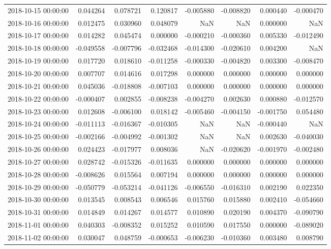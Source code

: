 \begin{tabular}{lrrrrrrr}
2018-10-15 00:00:00 & 0.044264 & 0.078721 & 0.120817 & -0.005880 & -0.008820 & 0.000440 & -0.000470 \\
2018-10-16 00:00:00 & 0.012475 & 0.030960 & 0.048079 & NaN & NaN & 0.000000 & NaN \\
2018-10-17 00:00:00 & 0.014282 & 0.045474 & 0.000000 & -0.000210 & -0.000360 & 0.005330 & -0.012490 \\
2018-10-18 00:00:00 & -0.049558 & -0.007796 & -0.032468 & -0.014300 & -0.020610 & 0.004200 & NaN \\
2018-10-19 00:00:00 & 0.017720 & 0.018610 & -0.011258 & -0.000330 & -0.004820 & 0.003300 & -0.008470 \\
2018-10-20 00:00:00 & 0.007707 & 0.014616 & 0.017298 & 0.000000 & 0.000000 & 0.000000 & 0.000000 \\
2018-10-21 00:00:00 & 0.045036 & -0.018808 & -0.007103 & 0.000000 & 0.000000 & 0.000000 & 0.000000 \\
2018-10-22 00:00:00 & -0.000407 & 0.002855 & -0.008238 & -0.004270 & 0.002630 & 0.000880 & -0.012570 \\
2018-10-23 00:00:00 & 0.012608 & -0.006100 & 0.018142 & -0.005460 & -0.004150 & -0.001750 & 0.054480 \\
2018-10-24 00:00:00 & -0.011113 & -0.016367 & -0.010305 & NaN & NaN & -0.000440 & NaN \\
2018-10-25 00:00:00 & -0.002166 & -0.004992 & -0.001302 & NaN & NaN & 0.002630 & -0.040030 \\
2018-10-26 00:00:00 & 0.024423 & -0.017977 & 0.008036 & NaN & -0.020620 & -0.001970 & -0.002480 \\
2018-10-27 00:00:00 & 0.028742 & -0.015326 & -0.011635 & 0.000000 & 0.000000 & 0.000000 & 0.000000 \\
2018-10-28 00:00:00 & -0.008626 & 0.015564 & 0.007194 & 0.000000 & 0.000000 & 0.000000 & 0.000000 \\
2018-10-29 00:00:00 & -0.050779 & -0.053214 & -0.041126 & -0.006550 & -0.016310 & 0.002190 & 0.022350 \\
2018-10-30 00:00:00 & 0.013545 & 0.008543 & 0.006546 & 0.015760 & 0.015880 & 0.002410 & -0.054660 \\
2018-10-31 00:00:00 & 0.014849 & 0.014267 & 0.014577 & 0.010890 & 0.020190 & 0.004370 & -0.090790 \\
2018-11-01 00:00:00 & 0.040303 & -0.008352 & 0.015252 & 0.010590 & 0.017550 & 0.000000 & -0.089020 \\
2018-11-02 00:00:00 & 0.030047 & 0.048759 & -0.000653 & -0.006230 & -0.010360 & 0.003480 & 0.008790 \\

\end{tabular}
